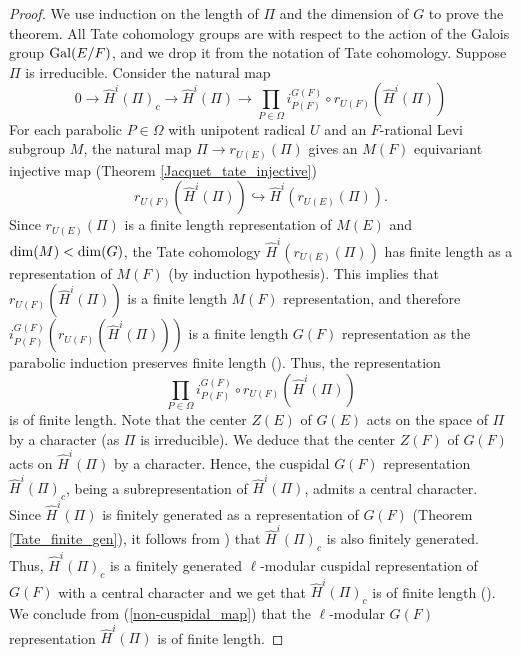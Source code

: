 \documentclass[10pt, reqno]{amsart}
\theoremstyle{plain}
\numberwithin{equation}{section} \newcommand{\di}{\operatorname{dim}}
\begin{document}
\begin{proof}
We use induction on the length
of $\Pi$ and the dimension of $G$ to prove the theorem.
All Tate cohomology groups are with respect to the action of the Galois group
${\rm Gal}(E/F)$, and we drop it from the notation of Tate cohomology. 
Suppose $\Pi$ is irreducible. Consider the natural map 
\begin{equation}\label{non-cuspidal_map}
0\longrightarrow \widehat{H}^i(\Pi)_c
\longrightarrow \widehat{H}^i(\Pi) 
\longrightarrow
\prod_{P\in \Omega} i_{P(F)}^{G(F)}\circ 
r_{U(F)}(\widehat{H}^i(\Pi))
\end{equation} 
For each parabolic $P\in \Omega$
with unipotent radical $U$ and an $F$-rational Levi subgroup $M$, the 
natural map $\Pi\rightarrow r_{U(E)}(\Pi)$ gives an 
$M(F)$ equivariant injective map (Theorem \ref{Jacquet_tate_injective})
$$ r_{U(F)}(\widehat{H}^i(\Pi)) \hookrightarrow \widehat{H}^i(r_{U(E)}(\Pi)). $$
Since $r_{U(E)}(\Pi)$ is a finite length representation of $M(E)$ and
${\rm dim}(M)< {\rm dim}(G)$, the Tate cohomology
$\widehat{H}^i(r_{U(E)}(\Pi))$ has finite length as a representation
of $M(F)$ (by induction hypothesis). This implies that
$r_{U(F)}(\widehat{H}^i(\Pi))$ is a finite length $M(F)$
representation, and therefore
$i_{P(F)}^{G(F)}(r_{U(F)}(\widehat{H}^i(\Pi)))$ is a finite length
$G(F)$ representation as the parabolic induction preserves finite
length (\cite[Chapter II, Section 5.13]{Vigneras_modl_book}). Thus,
the representation
$$ \prod_{P\in \Omega} i_{P(F)}^{G(F)}\circ r_{U(F)}(\widehat{H}^i(\Pi))$$
is of finite length. Note that the center $Z(E)$ of $G(E)$ acts on the
space of $\Pi$ by a character (as $\Pi$ is irreducible). We deduce
that the center $Z(F)$ of $G(F)$ acts on $\widehat{H}^i(\Pi)$ by a
character. Hence, the cuspidal $G(F)$ representation
$\widehat{H}^i(\Pi)_c$, being a subrepresentation of
$\widehat{H}^i(\Pi)$, admits a central character. Since
$\widehat{H}^i(\Pi)$ is finitely generated as a representation of
$G(F)$ (Theorem \ref{Tate_finite_gen}), it follows from
\cite[Corollary 4.5]{Dat_finiteness}) that $\widehat{H}^i(\Pi)_c$ is
also finitely generated. Thus, $\widehat{H}^i(\Pi)_c$ is a finitely
generated $\ell$-modular cuspidal representation of $G(F)$ with a
central character and we get that $\widehat{H}^i(\Pi)_c$ is of finite
length (\cite[Section 7.4, Chapter I]{Vigneras_modl_book}). We
conclude from (\ref{non-cuspidal_map}) that the $\ell$-modular $G(F)$
representation $\widehat{H}^i(\Pi)$ is of finite length.


\end{proof}
\end{document}
